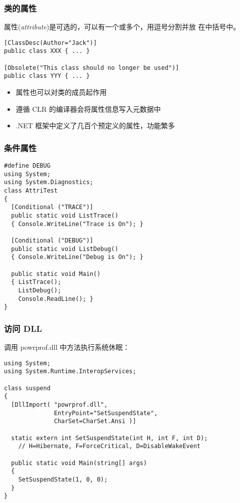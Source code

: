 \begin{frame}[fragile]
\frametitle{类的属性}
\CJKindent 属性(\textit{attribute})是可选的，可以有一个或多个，用逗号分割并放
在中括号中。

\begin{lstlisting}
[ClassDesc(Author="Jack")]
public class XXX { ... }

[Obsolete("This class should no longer be used")]
public class YYY { ... }

\end{lstlisting}

\begin{itemize}
\item 属性也可以对类的成员起作用
\item 遵循 CLR 的编译器会将属性信息写入元数据中
\item .NET 框架中定义了几百个预定义的属性，功能繁多
\end{itemize}
\end{frame}

\begin{frame}[fragile]
\frametitle{条件属性}
\begin{lstlisting}
#define DEBUG
using System;
using System.Diagnostics;
class AttriTest
{
  [Conditional ("TRACE")]
  public static void ListTrace()
  { Console.WriteLine("Trace is On"); }

  [Conditional ("DEBUG")]
  public static void ListDebug()
  { Console.WriteLine("Debug is On"); }

  public static void Main()
  { ListTrace();
    ListDebug();
    Console.ReadLine(); }
}
\end{lstlisting}
\end{frame}

\begin{frame}[fragile]
\frametitle{访问 DLL}
调用 powrprof.dll 中方法执行系统休眠：
\begin{lstlisting}
using System;
using System.Runtime.InteropServices;

class suspend
{
  [DllImport( "powrprof.dll",
              EntryPoint="SetSuspendState",
              CharSet=CharSet.Ansi )]

  static extern int SetSuspendState(int H, int F, int D);
    // H=Hibernate, F=ForceCritical, D=DisableWakeEvent

  public static void Main(string[] args)
  {
    SetSuspendState(1, 0, 0);
  }
}
\end{lstlisting}
\end{frame}


